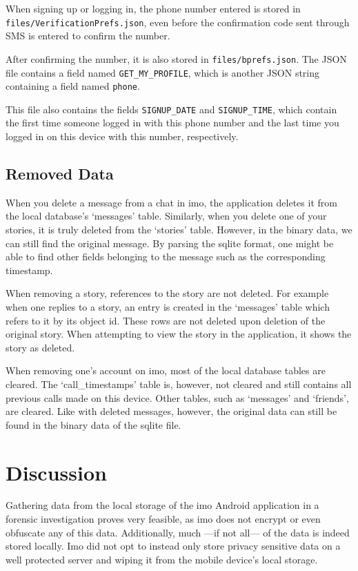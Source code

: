\documentclass[conference]{IEEEtran}
\begin{document}
When signing up or logging in, the phone number entered is stored in
\texttt{files/VerificationPrefs.json}, even before the confirmation code sent
through SMS is entered to confirm the number.

After confirming the number, it is also stored in \texttt{files/bprefs.json}.
The JSON file contains a field named \texttt{GET\_MY\_PROFILE}, which is another
JSON string containing a field named \texttt{phone}.

This file also contains the fields \texttt{SIGNUP\_DATE} and
\texttt{SIGNUP\_TIME}, which contain the first time someone logged in with this
phone number and the last time you logged in on this device with this number,
respectively.


\subsection{Removed Data}

When you delete a message from a chat in imo, the application deletes it from
the local database's `messages' table. Similarly, when you delete one of your
stories, it is truly deleted from the `stories' table. However, in the binary
data, we can still find the original message. By parsing the sqlite format, one
might be able to find other fields belonging to the message such as the
corresponding timestamp.

When removing a story, references to the story are not deleted. For example
when one replies to a story, an entry is created in the `messages' table which
refers to it by its object id. These rows are not deleted upon deletion of the
original story. When attempting to view the story in the application, it shows
the story as deleted.

When removing one's account on imo, most of the local database tables are
cleared. The `call\_timestamps' table is, however, not cleared and still
contains all previous calls made on this device. Other tables, such as
`messages' and `friends', are cleared. Like with deleted messages, however, the
original data can still be found in the binary data of the sqlite file.


\section{Discussion}\label{sec:disc}

Gathering data from the local storage of the imo Android application in a
forensic investigation proves very feasible, as imo does not encrypt or even
obfuscate any of this data. Additionally, much ---if not all--- of the data is
indeed stored locally. Imo did not opt to instead only store privacy sensitive
data on a well protected server and wiping it from the mobile device's local
storage.
\end{document}
